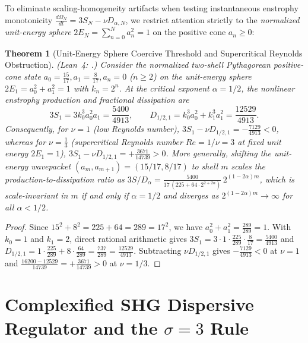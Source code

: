 \documentclass[11pt,a4paper]{article}
\newtheorem{theorem}{Theorem}[section]
\theoremstyle{definition}
\theoremstyle{remark}
\begin{document}
To eliminate scaling-homogeneity artifacts when testing instantaneous enstrophy monotonicity $\frac{d\Omega_N}{dt} = 3S_N - \nu D_{\alpha,N}$, we restrict attention strictly to the \emph{normalized unit-energy sphere} $2E_N = \sum_{n=0}^N a_n^2 = 1$ on the positive cone $a_n \ge 0$:

\begin{theorem}[Unit-Energy Sphere Coercive Threshold and Supercritical Reynolds Obstruction]\label{thm:unit_sphere}
\emph{(Lean~4: .)} Consider the normalized two-shell Pythagorean positive-cone state $a_0 = \frac{15}{17}, a_1 = \frac{8}{17}, a_n = 0$ ($n \ge 2$) on the unit-energy sphere $2E_1 = a_0^2 + a_1^2 = 1$ with $k_n = 2^n$. At the critical exponent $\alpha = 1/2$, the nonlinear enstrophy production and fractional dissipation are
\begin{equation}
3 S_1 = 3 k_0^3 a_0^2 a_1 = \frac{5400}{4913}, \qquad D_{1/2, 1} = k_0^3 a_0^2 + k_1^3 a_1^2 = \frac{12529}{4913}.
\end{equation}
Consequently, for $\nu = 1$ (low Reynolds number), $3S_1 - \nu D_{1/2,1} = -\frac{7129}{4913} < 0$, whereas for $\nu = \frac{1}{3}$ (supercritical Reynolds number $Re = 1/\nu = 3$ at fixed unit energy $2E_1 = 1$), $3S_1 - \nu D_{1/2,1} = +\frac{3671}{14739} > 0$. More generally, shifting the unit-energy wavepacket $(a_m, a_{m+1}) = (15/17, 8/17)$ to shell $m$ scales the production-to-dissipation ratio as $3S / D_\alpha = \frac{5400}{17\,(225 + 64\cdot 2^{2+2\alpha})}\, 2^{(1-2\alpha)m}$, which is scale-invariant in $m$ if and only if $\alpha = 1/2$ and diverges as $2^{(1-2\alpha)m} \to \infty$ for all $\alpha < 1/2$.
\end{theorem}
\begin{proof}
Since $15^2 + 8^2 = 225 + 64 = 289 = 17^2$, we have $a_0^2 + a_1^2 = \frac{289}{289} = 1$. With $k_0 = 1$ and $k_1 = 2$, direct rational arithmetic gives $3 S_1 = 3 \cdot 1 \cdot \frac{225}{289} \cdot \frac{8}{17} = \frac{5400}{4913}$ and $D_{1/2,1} = 1 \cdot \frac{225}{289} + 8 \cdot \frac{64}{289} = \frac{737}{289} = \frac{12529}{4913}$. Subtracting $\nu D_{1/2,1}$ gives $-\frac{7129}{4913} < 0$ at $\nu = 1$ and $\frac{16200 - 12529}{14739} = +\frac{3671}{14739} > 0$ at $\nu = 1/3$.
\end{proof}

\section{Complexified SHG Dispersive Regulator and the $\sigma = 3$ Rule}
\end{document}
